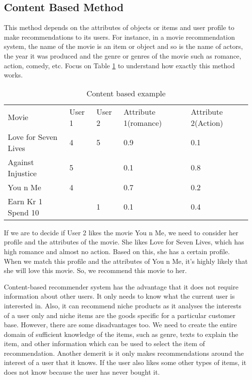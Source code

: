 \documentclass{jot}
\begin{document}
\subsection{Content Based Method}
This method depends on the attributes of objects or items and user profile to make recommendations to its users. For instance, in a movie recommendation system, the name of the movie is an item or object and so is the name of actors, the year it was produced and the genre or genres of the movie such as romance, action, comedy, etc. Focus on Table \ref{tab:content-based} to understand how exactly this method works.\\
\begin{table}[h!]
\begin{tabular}{lllll}
Movie                & User 1 & User 2 & Attribute 1(romance) & Attribute 2(Action) \\
Love for Seven Lives & 4      & 5      & 0.9                   & 0.1                  \\
Against Injustice    & 5      &        & 0.1                   & 0.8                  \\
You n Me             & 4      &        & 0.7                   & 0.2                  \\
Earn Kr 1 Spend 10   &        & 1      & 0.1                   & 0.4                  \\
\end{tabular}
\caption{Content based example}
\label{tab:content-based}
\end{table}

If we are to decide if User 2 likes the movie You n Me, we need to consider her profile and the attributes of the movie. She likes Love for Seven Lives, which has high romance and almost no action. Based on this, she has a certain profile. When we match this profile and the attributes of You n Me, it’s highly likely that she will love this movie. So, we recommend this movie to her.

Content-based recommender system has the advantage that it does not require information about other users. It only needs to know what the current user is interested in. Also, it can recommend niche products as it analyses the interests of a user only and niche items are the goods specific for a particular customer base. However, there are some disadvantages too. We need to create the entire domain of sufficient knowledge of the items, such as genre, texts to explain the item, and other information which can be used to select the item of recommendation. Another demerit is it only makes recommendations around the interest of a user that it knows. If the user also likes some other types of items, it does not know because the user has never bought it.
\end{document}
